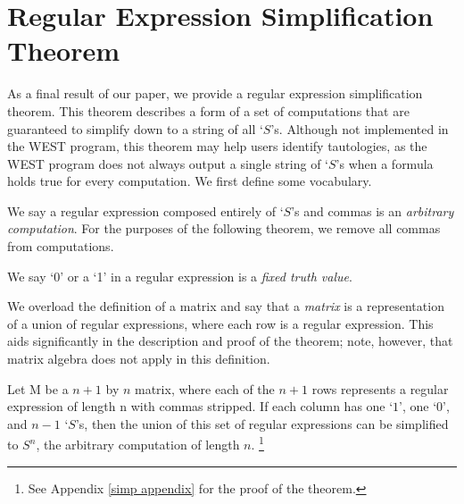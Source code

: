 \documentclass[runningheads]{llncs}
\begin{document}
\section{Regular Expression Simplification Theorem} \label{simpsection}
 As a final result of our paper, we provide a regular expression simplification theorem. This theorem describes a form of a set of computations that are guaranteed to simplify down to a string of all `$S$'s. Although not implemented in the WEST program, this theorem may help users identify tautologies, as the WEST program does not always output a single string of `$S$'s when a formula holds true for every computation. We first define some vocabulary.
\begin{definition}
We say a regular expression composed entirely of `$S$'s and commas is an \emph{arbitrary computation}. For the purposes of the following theorem, we remove all commas from computations.
\end{definition}
\begin{definition}
We say `0' or a `1' in a regular expression is a \emph{fixed truth value}.
\end{definition}
\begin{definition}
We overload the definition of a matrix and say that a \emph{matrix} is a representation of a union of regular expressions, where each row is a regular expression. This aids significantly in the description and proof of the theorem; note, however, that matrix algebra does not apply in this definition. 
\end{definition}
\begin{theorem} \label{simp}
Let M be a $n+1$ by $n$ matrix, where each of the $n+1$ rows represents a regular expression of length n with commas stripped. If each column has one `$1$', one `$0$', and $n-1$ `$S$'s, then the union of this set of regular expressions can be simplified to $S^n$, the arbitrary computation of length $n$. \footnote{See Appendix \ref{simp appendix} for the proof of the theorem.}
\end{theorem}
\end{document}
